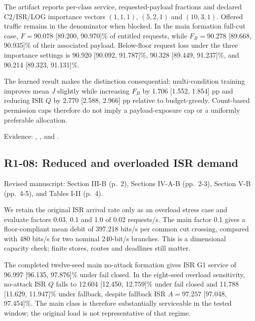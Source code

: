 \documentclass[a4paper,11pt]{article}
\begin{document}
The artifact reports per-class service, requested-payload fractions and declared C2/ISR/LOG importance vectors \((1,1,1)\), \((5,2,1)\) and \((10,3,1)\). Offered traffic remains in the denominator when blocked. In the main formation full-cut case, \(F=90.078\) {[}89.200, 90.970{]}\% of entitled requests, while \(F_B=90.278\) {[}89.668, 90.935{]}\% of their associated payload. Below-floor request loss under the three importance settings is 90.920 {[}90.092, 91.787{]}\%, 90.328 {[}89.449, 91.237{]}\%, and 90.214 {[}89.323, 91.131{]}\%.

The learned result makes the distinction consequential: multi-condition training improves mean \(J\) slightly while increasing \(F_B\) by 1.706 {[}1.552, 1.854{]} pp and reducing ISR \(Q\) by 2.770 {[}2.588, 2.966{]} pp relative to budget-greedy. Count-based permission caps therefore do not imply a payload-exposure cap or a uniformly preferable allocation.

Evidence: , , and .

\subsection{R1-08: Reduced and overloaded ISR demand}\label{r1-08-reduced-and-overloaded-isr-demand}

Revised manuscript: Section III-B (p.~2), Sections IV-A-B (pp.~2-3), Section V-B (pp.~4-5), and Tables I-II (p.~4).

We retain the original ISR arrival rate only as an overload stress case and evaluate factors 0.03, 0.1 and 1.0 of 0.02 requests/s. The main factor 0.1 gives a floor-compliant mean debit of 397.218 bits/s per common cut crossing, compared with 480 bits/s for two nominal 240-bit/s branches. This is a dimensional capacity check; finite stores, routes and deadlines still matter.

The completed twelve-seed main no-attack formation gives ISR G1 service of 96.997 {[}96.135, 97.876{]}\% under fail closed. In the eight-seed overload sensitivity, no-attack ISR \(Q\) falls to 12.604 {[}12.450, 12.759{]}\% under fail closed and 11.788 {[}11.629, 11.947{]}\% under fallback, despite fallback ISR \(A=97.257\) {[}97.048, 97.454{]}\%. The main class is therefore substantially serviceable in the tested window; the original load is not representative of that regime.
\end{document}
